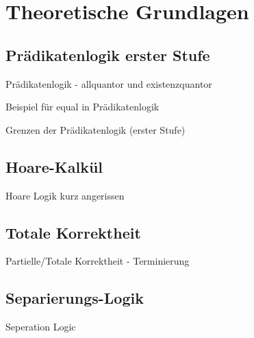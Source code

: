 ﻿
\chapter{Theoretische Grundlagen}

\section{Prädikatenlogik erster Stufe}

Prädikatenlogik - allquantor und existenzquantor


Beispiel für equal in Prädikatenlogik


Grenzen der Prädikatenlogik (erster Stufe)

\section{Hoare-Kalkül}

Hoare Logik kurz angerissen


\section{Totale Korrektheit}

Partielle/Totale Korrektheit - Terminierung

\section{Separierungs-Logik}
\label{sec:theorie:seperation-logic}

Seperation Logic
